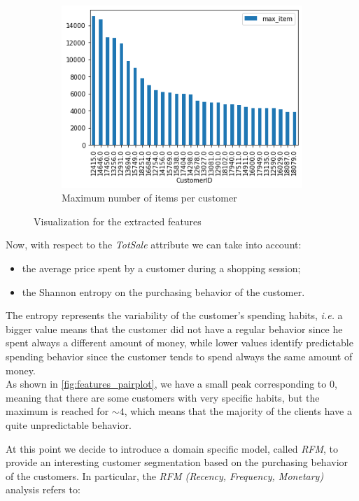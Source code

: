 \begin{figure}[h!]
\begin{subfigure}{.3\textwidth}
\centering
\includegraphics[width=\textwidth]{img/preparation/max_item.png}
\caption{Maximum number of items per customer}
\label{fig:max_item}
\end{subfigure}
\caption{Visualization for the extracted features}
\label{fig:qta_features}
\end{figure}

Now, with respect to the \emph{TotSale} attribute we can take into account:
\begin{itemize}
\item the average price spent by a customer during a shopping session;
\item the Shannon entropy on the purchasing behavior of the customer.
\end{itemize}

The entropy represents the variability of the customer's spending habits, \emph{i.e.} a bigger value means that the customer did not have a regular behavior since he spent always a different amount of money, while lower values identify predictable spending behavior since the customer tends to spend always the same amount of money.\\
As shown in \ref{fig:features_pairplot}, we have a small peak corresponding to 0, meaning that there are some customers with very specific habits, but the maximum is reached for $\sim 4$, which means that the majority of the clients have a quite unpredictable behavior.

At this point we decide to introduce a domain specific model, called \emph{RFM}, to provide an interesting customer segmentation based on the purchasing behavior of the customers. In particular, the \emph{RFM (Recency, Frequency, Monetary)} analysis refers to:

